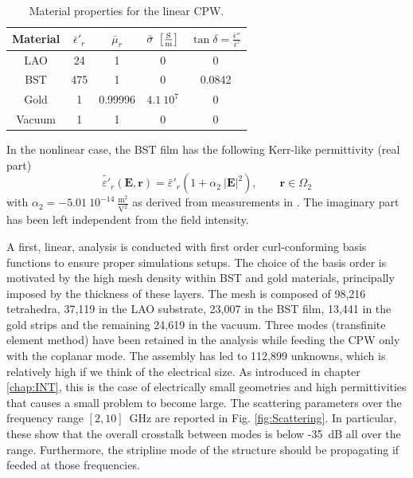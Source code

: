 \begin{table}[h!]
\begin{center}
\begin{tabular}{|c|c|c|c|c|} \hline
Material & ${\bar{\epsilon}'}_r$ & $\bar{\mu}_r$ & $\bar{\sigma}~\left[\frac{\mathrm{S}}{\mathrm{m}}\right]$ & $\tan \delta = \frac{\bar{\epsilon}''}{\bar{\epsilon}'}$ \\ \hline \hline
LAO & 24 & 1 & 0 & 0 \\ \hline
BST & 475 & 1 & 0 & 0.0842 \\ \hline
Gold & 1 & 0.99996 & $4.1~10^7$ & 0 \\ \hline
Vacuum & 1 & 1 & 0 & 0 \\ \hline
\end{tabular}
\end{center}
\caption{Material properties for the linear CPW.}
\label{tab:CPWmat}
\end{table} 

In the nonlinear case, the BST film has the following Kerr-like permittivity (real part)
\begin{equation}
\tilde{{\varepsilon}'}_r(\mathbf{E}, \mathbf{r}) = {\bar{\varepsilon}'}_r \left( 1 + 
\alpha_2 \ |\mathbf{E}|^2 \right), \qquad \mathbf{r} \in \Omega_2
\end{equation}
\noindent with $\alpha_2 = - 5.01~10^{-14}~\frac{\mathrm{m}^2}{\mathrm{V}^2}$ as derived from measurements in \cite{mateu2006measurements}. The imaginary part has been left independent from the field intensity.

A first, linear, analysis is conducted with first order curl-conforming basis functions to ensure proper simulations setups. The choice of the basis order is motivated by the high mesh density within BST and gold materials, principally imposed by the thickness of these layers. The mesh is composed of 98,216 tetrahedra, 37,119 in the LAO substrate, 23,007 in the BST film, 13,441 in the gold strips and the remaining 24,619 in the vacuum. Three modes (transfinite element method) have been retained in the analysis while feeding the CPW only with the coplanar mode. The assembly has led to 112,899 unknowns, which is relatively high if we think of the electrical size. As introduced in chapter \ref{chap:INT}, this is the case of electrically small geometries and high permittivities that causes a small problem to become large. The scattering parameters  over the frequency range $[2,10]$~GHz are reported in Fig. \ref{fig:Scattering}. In particular, these show that the overall crosstalk between modes is below -35~dB all over the range. Furthermore, the stripline mode of the structure should be propagating if feeded at those frequencies.
%

